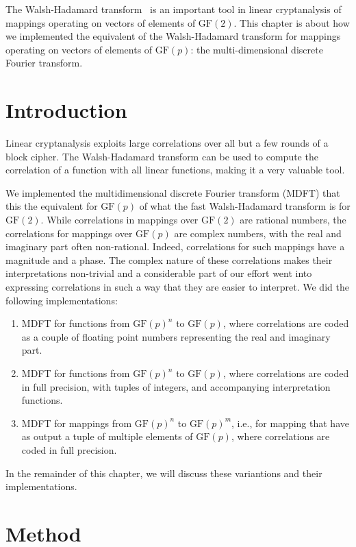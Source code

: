 \documentclass{report}
\newcommand{\GF}{\text{GF}}
\begin{document}
The Walsh-Hadamard transform~\cite{wiki2018transform} is an important tool in linear cryptanalysis of mappings operating on vectors of elements of $\GF(2)$.
This chapter is about how we implemented the equivalent of the Walsh-Hadamard transform for mappings operating on vectors of elements of ${\GF(p)}$: the multi-dimensional discrete Fourier transform.

\section{Introduction}

Linear cryptanalysis exploits large correlations over all but a few rounds of a block cipher. The Walsh-Hadamard transform can be used to compute the correlation of a function with all linear functions, making it a very valuable tool.

We implemented the multidimensional discrete Fourier transform (MDFT) that this the equivalent for $\GF(p)$ of what the fast Walsh-Hadamard transform is for $\GF(2)$. While correlations in mappings over $\GF(2)$ are rational numbers, the correlations for mappings over $\GF(p)$ are complex numbers, with the real and imaginary part often non-rational. Indeed, correlations for such mappings have a magnitude and a phase. The complex nature of these correlations makes their interpretations non-trivial and a considerable part of our effort went into expressing correlations in such a way that they are easier to interpret.
\newpage
\noindent We did the following implementations:
\begin{enumerate}
\item MDFT for functions from ${\GF(p)}^n$ to ${\GF(p)}$, where correlations are coded as a couple of floating point numbers representing the real and imaginary part.
\item MDFT for functions from ${\GF(p)}^n$ to ${\GF(p)}$, where correlations are coded in full precision, with tuples of integers, and accompanying interpretation functions.
\item MDFT for mappings from ${\GF(p)}^n$ to ${\GF(p)}^m$, i.e., for mapping that have as output a tuple of multiple elements of $\GF(p)$, where correlations are coded in full precision.
\end{enumerate}

In the remainder of this chapter, we will discuss these variantions and their implementations.

\section{Method}
\end{document}

